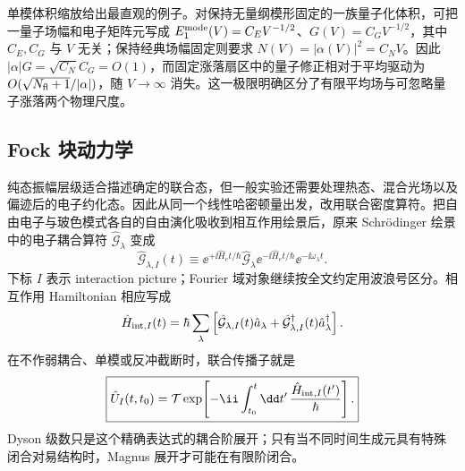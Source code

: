 单模体积缩放给出最直观的例子。对保持无量纲模形固定的一族量子化体积，可把一量子场幅和电子矩阵元写成 $E_{1}^{\rm mode}(V)=C_E V^{-1/2}$、$G(V)=C_GV^{-1/2}$，其中 $C_E,C_G$ 与 $V$ 无关；保持经典场幅固定则要求 $N(V)=|\alpha(V)|^2=C_NV$。因此 $|\alpha|G=\sqrt{C_N}C_G=O(1)$，而固定涨落扇区中的量子修正相对于平均驱动为 $O(\sqrt{N_{\rm fl}+1}/|\alpha|)$，随 $V\to\infty$ 消失。这一极限明确区分了有限平均场与可忽略量子涨落两个物理尺度。

\subsection{Fock 块动力学}

纯态振幅层级适合描述确定的联合态，但一般实验还需要处理热态、混合光场以及偏迹后的电子约化态。因此从同一个线性哈密顿量出发，改用联合密度算符。把自由电子与玻色模式各自的自由演化吸收到相互作用绘景后，原来 Schrödinger 绘景中的电子耦合算符 $\hat{\mathcal G}_\lambda$ 变成
\[
\hat{\mathcal G}_{\lambda,I}(t)
\equiv
\ee^{+\ii\hat H_e t/\hbar}\hat{\mathcal G}_\lambda
\ee^{-\ii\hat H_e t/\hbar}\ee^{-\ii\omega_\lambda t}.
\]
下标 $I$ 表示 interaction picture；Fourier 域对象继续按全文约定用波浪号区分。相互作用 Hamiltonian 相应写成
\[
\hat H_{{\rm int},I}(t)
=\hbar\sum_\lambda
\left[\hat{\mathcal G}_{\lambda,I}(t)\hat a_\lambda
+\hat{\mathcal G}_{\lambda,I}^\dagger(t)\hat a_\lambda^\dagger\right].
\]
在不作弱耦合、单模或反冲截断时，联合传播子就是
\begin{equation}
\boxed{
\hat U_I(t,t_0)
=\mathcal T\exp\!\left[-\ii\int_{t_0}^{t}\dd t'\,
\frac{\hat H_{{\rm int},I}(t')}{\hbar}\right].}
\label{eq:general_multimode_time_ordered_propagator}
\end{equation}
Dyson 级数只是这个精确表达式的耦合阶展开；只有当不同时间生成元具有特殊闭合对易结构时，Magnus 展开才可能在有限阶闭合。

